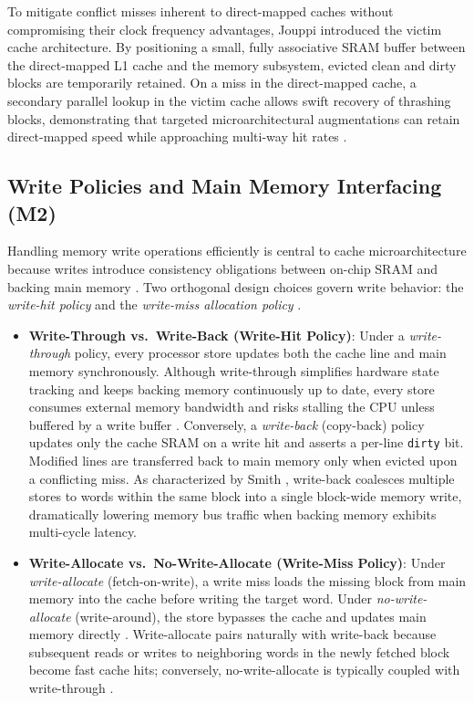 \documentclass[conference]{IEEEtran}
\begin{document}
To mitigate conflict misses inherent to direct-mapped caches without compromising their clock frequency advantages, Jouppi \cite{jouppi1990improving} introduced the victim cache architecture. By positioning a small, fully associative SRAM buffer between the direct-mapped L1 cache and the memory subsystem, evicted clean and dirty blocks are temporarily retained. On a miss in the direct-mapped cache, a secondary parallel lookup in the victim cache allows swift recovery of thrashing blocks, demonstrating that targeted microarchitectural augmentations can retain direct-mapped speed while approaching multi-way hit rates \cite{jouppi1990improving}.

\subsection{Write Policies and Main Memory Interfacing (M2)}
Handling memory write operations efficiently is central to cache microarchitecture because writes introduce consistency obligations between on-chip SRAM and backing main memory \cite{smith1982cache, patterson2020computer}. Two orthogonal design choices govern write behavior: the \emph{write-hit policy} and the \emph{write-miss allocation policy} \cite{hennessy2019computer}.

\begin{itemize}
    \item \textbf{Write-Through vs.\ Write-Back (Write-Hit Policy)}: Under a \emph{write-through} policy, every processor store updates both the cache line and main memory synchronously. Although write-through simplifies hardware state tracking and keeps backing memory continuously up to date, every store consumes external memory bandwidth and risks stalling the CPU unless buffered by a write buffer \cite{patterson2020computer}. Conversely, a \emph{write-back} (copy-back) policy updates only the cache SRAM on a write hit and asserts a per-line \texttt{dirty} bit. Modified lines are transferred back to main memory only when evicted upon a conflicting miss. As characterized by Smith \cite{smith1982cache}, write-back coalesces multiple stores to words within the same block into a single block-wide memory write, dramatically lowering memory bus traffic when backing memory exhibits multi-cycle latency.
    \item \textbf{Write-Allocate vs.\ No-Write-Allocate (Write-Miss Policy)}: Under \emph{write-allocate} (fetch-on-write), a write miss loads the missing block from main memory into the cache before writing the target word. Under \emph{no-write-allocate} (write-around), the store bypasses the cache and updates main memory directly \cite{hennessy2019computer}. Write-allocate pairs naturally with write-back because subsequent reads or writes to neighboring words in the newly fetched block become fast cache hits; conversely, no-write-allocate is typically coupled with write-through \cite{patterson2020computer}.
\end{itemize}
\end{document}

